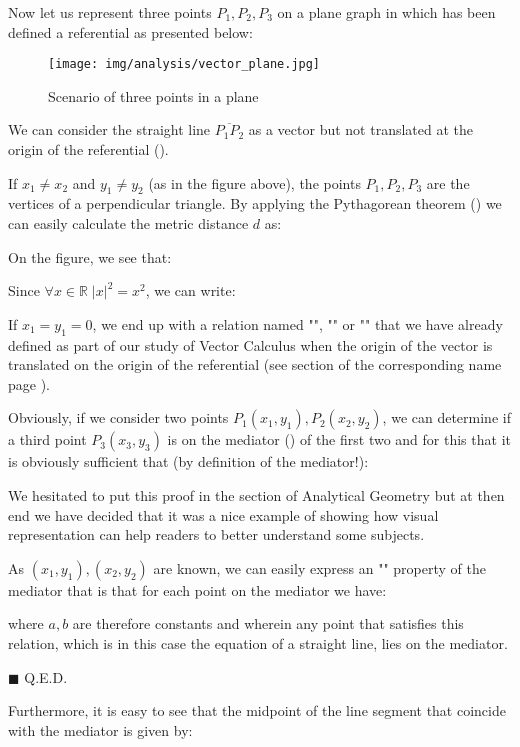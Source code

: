 Now let us represent three points $P_1,P_2,P_3$ on a plane graph in which has been defined a referential as presented below:

\begin{figure}[H]
\centering
\texttt{[image: img/analysis/vector\_plane.jpg]}
\caption[]{Scenario of three points in a plane}
\end{figure}

We can consider the straight line $\overline{P_1P_2}$ as a vector but not translated at the origin of the referential ().

If $x_1\neq x_2$ and $y_1\neq y_2$ (as in the figure above), the points $P_1,P_2,P_3$ are the vertices of a perpendicular triangle. By applying the Pythagorean theorem () we can easily calculate the metric distance $d$ as:
	
	On the figure, we see that:
	
	Since $\forall x \in \mathbb{R} \; \vert x \vert ^2 =x^2$, we can write:
	
	If $x_1=y_1=0$, we end up with a relation named "", "" or "" that we have already defined as part of our study of Vector Calculus when the origin of the vector is translated on the origin of the referential (see section of the corresponding name page \pageref{vector norm}).
	
	\begin{theorem}
	Obviously, if we consider two points $P_1(x_1,y_1),P_2(x_2,y_2)$, we can determine if a third point $P_3(x_3,y_3)$ is on the mediator () of the first two and for this that it is obviously sufficient that (by definition of the mediator!):
	
	\end{theorem}
	\begin{tcolorbox}[title=Remark,colframe=black,arc=10pt]
	We hesitated to put this proof in the section of Analytical Geometry but at then end we have decided that it was a nice example of showing how visual representation can help readers to better understand some subjects.
	\end{tcolorbox}	
	\begin{dem}
	As $(x_1,y_1),(x_2,y_2)$ are known, we can easily express an "" property of the mediator that is that for each point on the mediator we have:
	
	where $a, b$ are therefore constants and wherein any point that satisfies this relation, which is in this case the equation of a straight line, lies on the mediator.
	\begin{flushright}
		$\blacksquare$  Q.E.D.
	\end{flushright}
	\end{dem}
	Furthermore, it is easy to see that the midpoint of the line segment that coincide with the mediator is given by:
	
